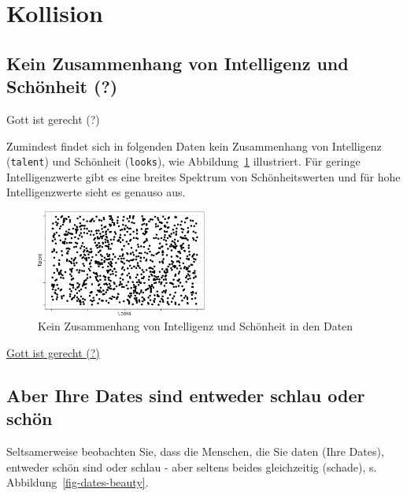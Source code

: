 \documentclass[
  a4paper,
  DIV=11]{scrreprt}
\theoremstyle{definition}
\theoremstyle{remark}
\begin{document}
\hypertarget{kollision}{%
\section{Kollision}\label{kollision}}

\hypertarget{kein-zusammenhang-von-intelligenz-und-schuxf6nheit}{%
\subsection{Kein Zusammenhang von Intelligenz und Schönheit
(?)}\label{kein-zusammenhang-von-intelligenz-und-schuxf6nheit}}

Gott ist gerecht (?)

Zumindest findet sich in folgenden Daten kein Zusammenhang von
Intelligenz (\texttt{talent}) und Schönheit (\texttt{looks}), wie
Abbildung~\ref{fig-iq-schoen} illustriert. Für geringe Intelligenzwerte
gibt es eine breites Spektrum von Schönheitswerten und für hohe
Intelligenzwerte sieht es genauso aus.

\begin{figure}

{\centering \includegraphics[width=0.5\textwidth,height=\textheight]{./kausal_files/figure-pdf/fig-iq-schoen-1.pdf}

}

\caption{\label{fig-iq-schoen}Kein Zusammenhang von Intelligenz und
Schönheit in den Daten}

\end{figure}

\href{https://twitter.com/TheTweetOfGod/status/1462594155176026123}{Gott
ist gerecht (?)}

\hypertarget{aber-ihre-dates-sind-entweder-schlau-oder-schuxf6n}{%
\subsection{Aber Ihre Dates sind entweder schlau oder
schön}\label{aber-ihre-dates-sind-entweder-schlau-oder-schuxf6n}}

Seltsamerweise beobachten Sie, dass die Menschen, die Sie daten (Ihre
Dates), entweder schön sind oder schlau - aber seltens beides
gleichzeitig (schade), s. Abbildung~\ref{fig-dates-beauty}.
\end{document}
